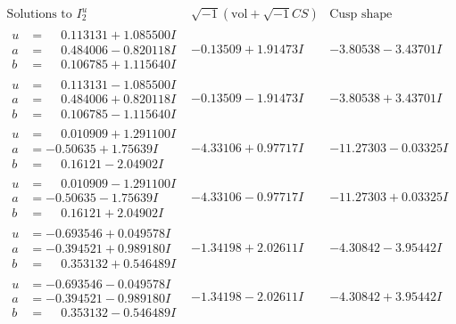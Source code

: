 \documentclass[1p]{elsarticle_modified}
\theoremstyle{definition}
\newcommand{\I}{\sqrt{-1}}
\begin{document}
$$\begin{array}{c|c|c}  
\text{Solutions to }I^u_{2}& \I (\text{vol} + \sqrt{-1}CS) & \text{Cusp shape}\\
 \hline 
\begin{aligned}
u &= \phantom{-}0.113131 + 1.085500 I \\
a &= \phantom{-}0.484006 - 0.820118 I \\
b &= \phantom{-}0.106785 + 1.115640 I\end{aligned}
 & -0.13509 + 1.91473 I & -3.80538 - 3.43701 I \\ \hline\begin{aligned}
u &= \phantom{-}0.113131 - 1.085500 I \\
a &= \phantom{-}0.484006 + 0.820118 I \\
b &= \phantom{-}0.106785 - 1.115640 I\end{aligned}
 & -0.13509 - 1.91473 I & -3.80538 + 3.43701 I \\ \hline\begin{aligned}
u &= \phantom{-}0.010909 + 1.291100 I \\
a &= -0.50635 + 1.75639 I \\
b &= \phantom{-}0.16121 - 2.04902 I\end{aligned}
 & -4.33106 + 0.97717 I & -11.27303 - 0.03325 I \\ \hline\begin{aligned}
u &= \phantom{-}0.010909 - 1.291100 I \\
a &= -0.50635 - 1.75639 I \\
b &= \phantom{-}0.16121 + 2.04902 I\end{aligned}
 & -4.33106 - 0.97717 I & -11.27303 + 0.03325 I \\ \hline\begin{aligned}
u &= -0.693546 + 0.049578 I \\
a &= -0.394521 + 0.989180 I \\
b &= \phantom{-}0.353132 + 0.546489 I\end{aligned}
 & -1.34198 + 2.02611 I & -4.30842 - 3.95442 I \\ \hline\begin{aligned}
u &= -0.693546 - 0.049578 I \\
a &= -0.394521 - 0.989180 I \\
b &= \phantom{-}0.353132 - 0.546489 I\end{aligned}
 & -1.34198 - 2.02611 I & -4.30842 + 3.95442 I \\ \hline\begin{aligned}

\end{aligned}
\end{array}$$
\end{document}
